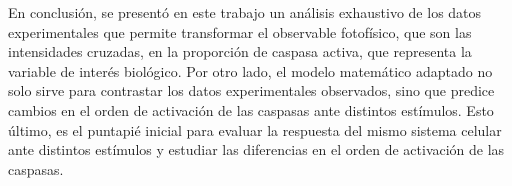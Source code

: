 En conclusión, se presentó en este trabajo un análisis exhaustivo de los datos experimentales que permite transformar el observable fotofísico, que son las intensidades cruzadas, en la proporción de caspasa activa, que representa la variable de interés biológico. Por otro lado, el modelo matemático adaptado no solo sirve para contrastar los datos experimentales observados, sino que predice cambios en el orden de activación de las caspasas ante distintos estímulos. Esto último, es el puntapié inicial para evaluar la respuesta del mismo sistema celular ante distintos estímulos y estudiar las diferencias en el orden de activación de las caspasas.